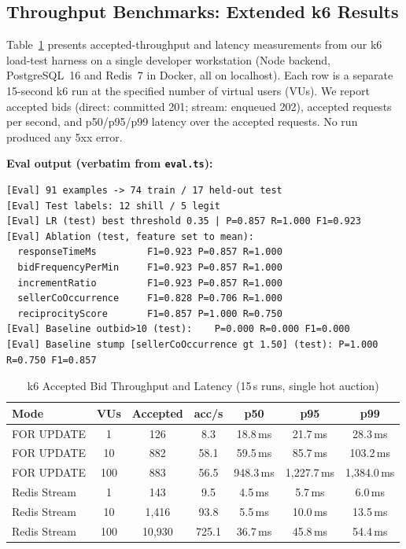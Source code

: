 \documentclass[11pt]{article}
\begin{document}
\subsection{Throughput Benchmarks: Extended k6 Results}

Table~\ref{tab:k6_ext} presents accepted-throughput and latency
measurements from our k6 load-test harness on a single developer
workstation (Node backend, PostgreSQL~16 and Redis~7 in Docker, all on
localhost). Each row is a separate 15-second k6 run at the specified
number of virtual users (VUs). We report accepted bids (direct: committed
201; stream: enqueued 202), accepted requests per second, and p50/p95/p99
latency over the accepted requests. No run produced any 5xx error.

\textbf{Eval output (verbatim from \texttt{eval.ts}):}
\begin{lstlisting}[language={},caption={Actual eval.ts console output.}]
[Eval] 91 examples -> 74 train / 17 held-out test
[Eval] Test labels: 12 shill / 5 legit
[Eval] LR (test) best threshold 0.35 | P=0.857 R=1.000 F1=0.923
[Eval] Ablation (test, feature set to mean):
  responseTimeMs         F1=0.923 P=0.857 R=1.000
  bidFrequencyPerMin     F1=0.923 P=0.857 R=1.000
  incrementRatio         F1=0.923 P=0.857 R=1.000
  sellerCoOccurrence     F1=0.828 P=0.706 R=1.000
  reciprocityScore       F1=0.857 P=1.000 R=0.750
[Eval] Baseline outbid>10 (test):    P=0.000 R=0.000 F1=0.000
[Eval] Baseline stump [sellerCoOccurrence gt 1.50] (test): P=1.000 R=0.750 F1=0.857
\end{lstlisting}

\begin{table}[ht]
\centering
\caption{k6 Accepted Bid Throughput and Latency (15\,s runs, single hot auction)}
\label{tab:k6_ext}
\begin{tabular}{lcccccc}
\toprule
\textbf{Mode} & \textbf{VUs} & \textbf{Accepted} & \textbf{acc/s} & \textbf{p50} & \textbf{p95} & \textbf{p99} \\
\midrule
FOR UPDATE & 1 & 126 & 8.3 & 18.8\,ms & 21.7\,ms & 28.3\,ms \\
FOR UPDATE & 10 & 882 & 58.1 & 59.5\,ms & 85.7\,ms & 103.2\,ms \\
FOR UPDATE & 100 & 883 & 56.5 & 948.3\,ms & 1{,}227.7\,ms & 1{,}384.0\,ms \\
\midrule
Redis Stream & 1 & 143 & 9.5 & 4.5\,ms & 5.7\,ms & 6.0\,ms \\
Redis Stream & 10 & 1{,}416 & 93.8 & 5.5\,ms & 10.0\,ms & 13.5\,ms \\
Redis Stream & 100 & 10{,}930 & 725.1 & 36.7\,ms & 45.8\,ms & 54.4\,ms \\
\bottomrule
\end{tabular}
\end{table}
\end{document}
